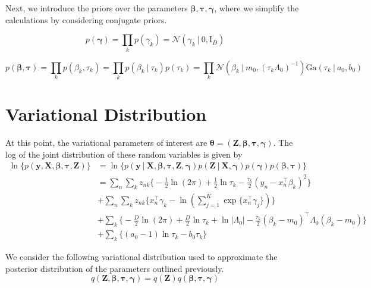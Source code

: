 \documentclass[twoside,11pt]{article}
\newcommand{\eye}{\mathrm{I}}
\newcommand\given[1][]{\:#1\vert\:}
\newcommand{\transpose}[1]{#1^{\intercal}}
\newcommand{\kprod}{\prod_{k}}
\newcommand{\nsum}{\sum_{n}}
\newcommand{\ksum}{\sum_{k}}
\newcommand{\boldbeta}{\boldsymbol\beta}
\newcommand{\boldgamma}{\boldsymbol\gamma}
\newcommand{\boldtau}{\boldsymbol\tau}
\newcommand{\sumexp}{\sum_{j=1}^{K} \exp \{ \transpose{x_n} \gamma_j \}}
\newcommand{\pr}[1]{p \left( #1 \right)}
\begin{document}
Next, we introduce the priors over the parameters $\boldbeta, \boldtau, \boldgamma$, where we simplify the calculations by considering conjugate priors. 

\begin{equation} \label{eq:gamma_prior}
	 p(\boldgamma) = \kprod p(\gamma_k) = \mathcal{N} \left( \gamma_k \given 0, \eye_D \right)
\end{equation}

\begin{equation} \label{eq:betatau_prior}
	 p\left( \boldbeta, \boldtau \right) = \prod_{k} p(\beta_k, \tau_k) = \kprod p(\beta_k \given \tau_k) p(\tau_k) = 
	 \kprod \mathcal{N} \left( \beta_k \given m_0, (\tau_k \Lambda_0)^{-1} \right) \mathrm{Ga} \left( \tau_k \given a_0, b_0 \right)
\end{equation}


\section{Variational Distribution}
At this point, the variational parameters of interest are $\boldsymbol \theta = (\mathbf{Z}, \boldbeta, \boldtau, \boldgamma)$. The log of the joint distribution of these random variables is given by
\begin{equation} \label{eq:joint}
\begin{split}
	\ln \bigg\{ \pr{\mathbf{y}, \mathbf{X}, \boldbeta, \boldtau, \mathbf{Z}} \bigg\} &= 
	\ln \bigg\{\pr{\mathbf{y} \given \mathbf{X}, \boldsymbol\beta, \boldsymbol{\tau}, \mathbf{Z}, \boldsymbol\gamma}\pr{\mathbf{Z}\given \mathbf{X}, \boldgamma}\pr{\boldgamma}\pr{\boldbeta, \boldtau} \bigg\}\\
	&= \nsum \ksum z_{nk}\bigg\{ -\frac{1}{2}\ln(2\pi) + \frac{1}{2} \ln \tau_k - \frac{\tau_k}{2} \left( y_n - \transpose{x_n}\beta_k\right)^2 \bigg\} \\
	& + \nsum \ksum z_{nk} \bigg\{ \transpose{x_n} \gamma_k - \ln\left( \sumexp \right) \bigg\} \\
	& + \ksum  \bigg\{ -\frac{D}{2} \ln (2\pi) + \frac{D}{2} \ln \tau_k + \ln | \Lambda_0| - \frac{\tau_k}{2}\transpose{(\beta_k - m_0)} \Lambda_0 (\beta_k - m_0)\bigg\} \\
	& + \ksum \bigg\{ (a_0 - 1) \ln \tau_k - b_0 \tau_k \bigg\}
\end{split}
\end{equation}

We consider the following variational distribution used to approximate the posterior distribution of the parameters outlined previously.
\begin{equation} \label{eq:variational}
	q \left( \mathbf{Z}, \boldbeta, \boldtau, \boldgamma \right) = q(\mathbf{Z}) q(\boldbeta, \boldtau, \boldgamma)
\end{equation}
\end{document}
